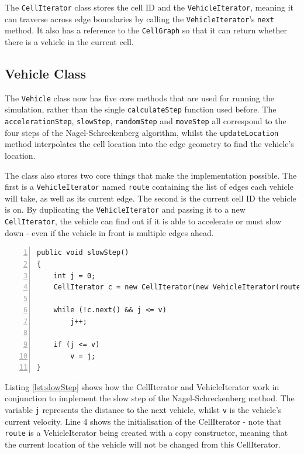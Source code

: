 \documentclass[ %
                    author={Alexander Hill},
                supervisor={Dr. Benjamin Sach},
                    degree={MEng},
                     title={MARMOSET},
                  subtitle={Multi-Agent Route Management using Online Simulation for Efficient Transportation},
                      type={research},
                      year={2016} ]{dissertation}
\begin{document}
The \texttt{CellIterator} class stores the cell ID and the
\texttt{VehicleIterator}, meaning it can traverse across edge boundaries by
calling the \texttt{VehicleIterator}'s \texttt{next} method. It also has a
reference to the \texttt{CellGraph} so that it can return whether there is a
vehicle in the current cell.

\subsection{Vehicle Class}

The \texttt{Vehicle} class now has five core methods that are used for running the
simulation, rather than the single \texttt{calculateStep} function used before.
The \texttt{accelerationStep}, \texttt{slowStep}, \texttt{randomStep} and
\texttt{moveStep} all correspond to the four steps of the Nagel-Schreckenberg
algorithm, whilst the \texttt{updateLocation} method interpolates the cell
location into the edge geometry to find the vehicle's location.

The class also stores two core things that make the implementation possible.
The first is a \texttt{Vehicle\-Iterator} named \texttt{route} containing the
list of edges each vehicle will take, as well as its current edge. The second is
the current cell ID the vehicle is on. By duplicating the
\texttt{VehicleIterator} and passing it to a new \texttt{CellIterator}, the
vehicle can find out if it is able to accelerate or must slow down - even if the
vehicle in front is multiple edges ahead.

\begin{minipage}{\linewidth}
\begin{lstlisting}[caption={The \texttt{slowStep} implementation making use of the CellIterator},
                    label=lst:slowStep, numbers=left]
public void slowStep()
{
    int j = 0;
    CellIterator c = new CellIterator(new VehicleIterator(route), cg, cellId);

    while (!c.next() && j <= v)
        j++;

    if (j <= v)
        v = j;
}
\end{lstlisting}
\end{minipage}

Listing \ref{lst:slowStep} shows how the CellIterator and VehicleIterator work
in conjunction to implement the slow step of the Nagel-Schreckenberg method.
The variable \texttt{j} represents the distance to the next vehicle, whilst
\texttt{v} is the vehicle's current velocity. Line 4 shows the initialisation of
the CellIterator - note that \texttt{route} is a VehicleIterator being created
with a copy constructor, meaning that the current location of the vehicle will
not be changed from this CellIterator.
\end{document}
